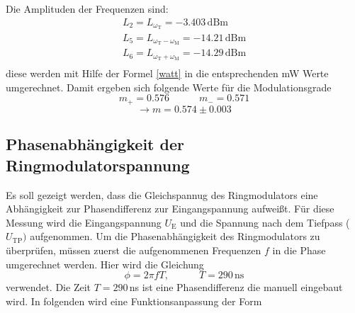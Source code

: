 Die Amplituden der Frequenzen sind:
\begin{align}
    L_2=L_{\omega_{\text{T}}}=-3.403 \, \text{dBm}\\
    L_5=L_{\omega_{\text{T}}-\omega_{\text{M}}}=-14.21 \, \text{dBm}\\
    L_6=L_{\omega_{\text{T}}+\omega_{\text{M}}}=-14.29 \, \text{dBm}\\
\end{align}
diese werden mit Hilfe der Formel \ref{watt} in die entsprechenden mW Werte
umgerechnet.
Damit ergeben sich folgende Werte für die Modulationsgrade
$$ m_+= 0.576 \quad \quad \quad m_-=0.571$$
$$\rightarrow m= 0.574 \pm 0.003$$

\subsection{Phasenabhängigkeit der Ringmodulatorspannung}

Es soll gezeigt werden, dass die Gleichspannug des Ringmodulators eine
Abhängigkeit zur Phasendifferenz zur Eingangspannung aufweißt. Für diese
Messung wird die Eingangspannung $U_\text{E}$ und die Spannung nach dem
Tiefpass ($U_\text{TP})$ aufgenommen.
Um die Phasenabhängigkeit des Ringmodulators zu überprüfen, müssen zuerst
die aufgenommenen Frequenzen $f$ in die Phase umgerechnet werden. Hier wird die
Gleichung
$$ \phi=2  \pi f T, \quad \quad \quad T=290\,\text{ns} $$
verwendet. Die Zeit $T=290\,$ns ist eine Phasendifferenz die manuell eingebaut wird.
In folgenden wird eine Funktionsanpassung der Form

